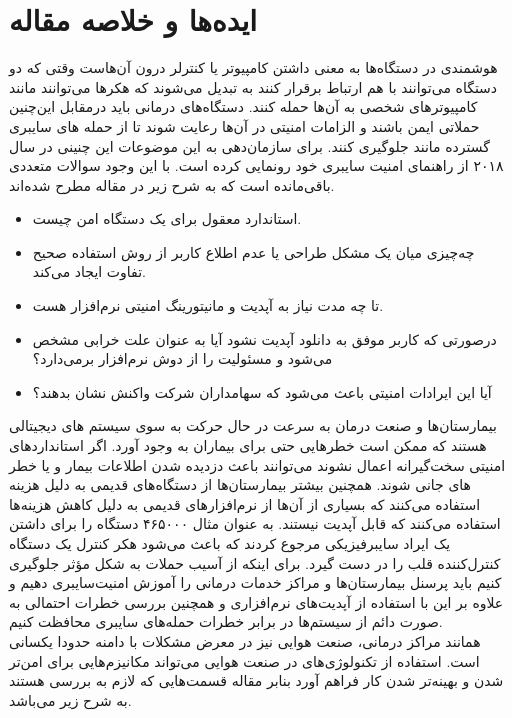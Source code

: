 \documentclass[a4paper, 11pt]{article}
\begin{document}
\section{ایده‌ها و خلاصه مقاله}
هوشمندی در دستگاه‌ها به معنی داشتن کامپیوتر یا کنترلر درون آن‌هاست وقتی که دو دستگاه می‌توانند با
هم ارتباط برقرار کنند به 
تبدیل می‌شوند که هکر‌ها می‌توانند مانند کامپیوتر‌های شخصی به آن‌ها حمله کنند.
دستگاه‌های درمانی باید در‌مقابل این‌چنین حملاتی ایمن باشند و الزامات امنیتی در آن‌ها رعایت شوند تا از 
حمله های سایبری گسترده مانند
جلوگیری کنند.
برای سازمان‌دهی به این موضوعات این چنینی
در سال ۲۰۱۸ از راهنمای امنیت سایبری خود رونمایی کرده است.
با این وجود سوالات متعددی باقی‌‌مانده است که به شرح زیر در مقاله مطرح شده‌اند.
\begin{itemize}
    \item استاندارد معقول برای یک دستگاه  امن چیست.
    \item چه‌چیزی میان یک مشکل طراحی یا عدم اطلاع کاربر از روش استفاده صحیح تفاوت ایجاد می‌کند.
    \item تا چه مدت نیاز به آپدیت و مانیتورینگ امنیتی نرم‌افزار هست.
    \item درصورتی که کاربر موفق به دانلود آپدیت نشود آیا به عنوان علت خرابی مشخص می‌شود
    و مسئولیت را از دوش نرم‌افزار برمی‌دارد؟
    \item آیا این ایرادات امنیتی باعث می‌شود که سهامداران شرکت واکنش نشان بدهند؟
\end{itemize}
بیمارستان‌ها و صنعت درمان به سرعت در حال حرکت به سوی سیستم های دیجیتالی هستند
که ممکن است خطرهایی حتی برای بیماران به وجود آورد. اگر استاندارد‌های امنیتی سخت‌گیرانه اعمال نشوند
می‌توانند باعث دزدیده شدن اطلاعات بیمار و یا خطر های جانی شوند.
همچنین بیشتر بیمارستان‌ها از دستگاه‌های قدیمی به دلیل هزینه استفاده می‌کنند که بسیاری از آن‌ها از
نرم‌افزار‌های قدیمی به دلیل کاهش هزینه‌ها استفاده می‌کنند که قابل آپدیت نیستند.
به عنوان مثال 
۴۶۵۰۰۰ دستگاه را برای داشتن یک ایراد سایبرفیزیکی مرجوع کردند که باعث می‌شود هکر کنترل یک دستگاه
کنترل‌کننده قلب را در دست گیرد.
برای اینکه از آسیب حملات به شکل مؤثر جلوگیری کنیم باید پرسنل بیمارستان‌ها و مراکز خدمات درمانی
را آموزش امنیت‌سایبری دهیم و علاوه بر این با استفاده از آپدیت‌های نرم‌افزاری و همچنین بررسی خطرات
احتمالی به صورت دائم از سیستم‌ها در برابر خطرات حمله‌های سایبری محافظت کنیم. \\
همانند مراکز درمانی، صنعت هوایی نیز در معرض مشکلات با دامنه حدودا یکسانی است.
استفاده از تکنولوژی‌های
در صنعت هوایی می‌تواند مکانیزم‌هایی برای امن‌تر شدن و بهینه‌تر شدن کار فراهم آورد بنابر مقاله
قسمت‌هایی که لازم به بررسی هستند به شرح زیر می‌باشد.
\end{document}
